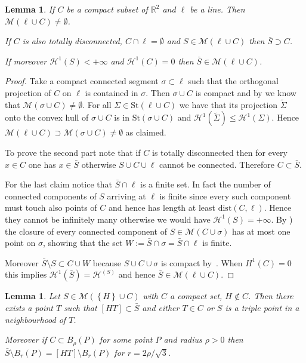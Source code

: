\documentclass{article}
\newcommand{\RR}{\mathbb R}
\renewcommand{\H}{\mathcal H}
\newcommand{\ENCLOSE}[1]{\left\{#1\right\}}
\newcommand{\St}{\mathrm{St}}
\newcommand{\M}{\mathcal{M}}
\renewcommand{\H}{\mathcal{H}}
\newcommand{\dist}{\mathrm{dist}}
\newtheorem{lemma}[theorem]{Lemma}
\theoremstyle{definition}
\theoremstyle{remark}
\begin{document}
\begin{lemma}\label{lm:exists}
  If $C$ be a compact subset of $\RR^2$ and $\ell$ be a line.
  Then $\M(\ell\cup C)\neq \emptyset$.
  
  If $C$ is also totally disconnected, $C\cap \ell=\emptyset$ 
  and $S\in \M(\ell\cup C)$  
  then $\bar S \supset C$.

  If moreover $\H^1(S)<+\infty$ and $\H^1(C)=0$ 
  then $\bar S\in \M(\ell\cup C)$.
\end{lemma}
\begin{proof}
  Take a compact connected segment $\sigma\subset \ell$ such that 
  the orthogonal projection of $C$ on $\ell$ is contained 
  in $\sigma$. 
  Then $\sigma\cup C$ is compact and by 
  \cite{PaoSte} we know that 
  $\M(\sigma \cup C)\neq \emptyset$.
  For all $\Sigma \in \St(\ell\cup C)$ we have that its projection 
  $\tilde \Sigma$ 
  onto the convex hull of $\sigma\cup C$ is in $\St(\sigma\cup C)$
  and $\H^1(\tilde \Sigma)\le \H^1(\Sigma)$.
  Hence $\M(\ell\cup C)\supset \M(\sigma\cup C)\neq \emptyset$ as claimed.

  To prove the second part note that if $C$ is totally disconnected 
  then for every $x\in C$ one has $x\in \bar S$ otherwise 
  $S\cup C\cup \ell$ cannot be connected. 
  Therefore $C\subset \bar S$. 
  
  For the last claim notice that $\bar S\cap \ell$ is a finite set.
  In fact the number of connected components of $S$ arriving at $\ell$ 
  is finite since every such component must touch also points of $C$ 
  and hence has length at least $\dist(C,\ell)$.  
  Hence they cannot be infinitely many otherwise 
  we would have $\H^1(S)=+\infty$.
  By \cite{PaoSte}) the closure of every connected component 
  of $S\in\M(C\cup \sigma)$ 
  has at most one point on $\sigma$, showing that the set 
  $W:=\bar S\cap \sigma = \bar S \cap \ell$ 
  is finite.

  Moreover $\bar S \setminus S \subset C\cup W$ because 
  $S\cup C\cup \sigma$ is compact by~\cite{PaoSte}.
  When $H^1(C)=0$ this implies $\H^1(\bar S)=\H^(S)$ and hence 
  $\bar S\in \M(\ell\cup C)$.
\end{proof}

\begin{lemma}\label{lm:angle}
Let $S\in \M(\ENCLOSE{H} \cup C)$ with $C$ a compact set, $H\not \in C$.
Then there exists a point $T$ such that $[HT]\subset \bar S$ 
and either $T\in C$ or $S$ is a triple point in a neighbourhood of $T$.

Moreover if $C\subset B_\rho(P)$ for some point $P$ and radius $\rho > 0$
then $\bar S\setminus B_r(P) = [HT]\setminus B_r(P)$ 
for $r = 2\rho/\sqrt 3$.
\end{lemma}
\end{document}
